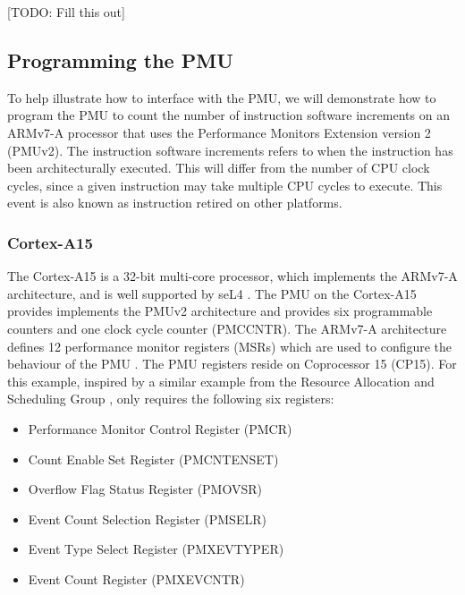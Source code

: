 {[TODO: Fill this out]

\subsection{Programming the PMU}\label{sect:programming_pmu}

To help illustrate how to interface with the PMU, we will demonstrate how to program the PMU to count the number of instruction software increments on an ARMv7-A processor that uses the Performance Monitors Extension version 2 (PMUv2). The instruction software increments refers to when the instruction has been architecturally executed. This will differ from the number of CPU clock cycles, since a given instruction may take multiple CPU cycles to execute. This event is also known as instruction retired on other platforms.

\subsubsection{Cortex-A15}

The Cortex-A15 is a 32-bit multi-core processor, which implements the ARMv7-A architecture, and is well supported by seL4 \cite{DocsSeL4Hardware}. The PMU on the Cortex-A15 provides implements the PMUv2 architecture and provides six programmable counters \cite{DocsArmCortexA15PMU} and one clock cycle counter (PMCCNTR). The ARMv7-A architecture defines 12 performance monitor registers (MSRs) which are used to configure the behaviour of the PMU \cite{DocsArmv7PMURegs}. The PMU registers reside on Coprocessor 15 (CP15). For this example, inspired by a similar example from the Resource Allocation and Scheduling Group \cite{TutHowToUsePMU}, only requires the following six registers:

\ssp

\begin{itemize}
    \item Performance Monitor Control Register (PMCR)
    \item Count Enable Set Register (PMCNTENSET)
    \item Overflow Flag Status Register (PMOVSR)
    \item Event Count Selection Register (PMSELR)
    \item Event Type Select Register (PMXEVTYPER)
    \item Event Count Register (PMXEVCNTR)
\end{itemize}

\dsp

}
